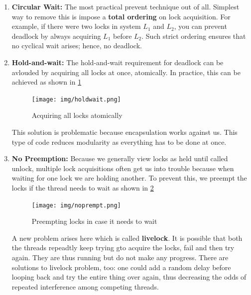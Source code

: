 \begin{enumerate}
    \item \textbf{Circular Wait:} The most practical prevent technique out of
        all. Simplest way to remove this is impose a \textbf{total ordering} on
        lock acquisition. For example, if there were two locks in system
        $L_1$ and $L_2$, you can prevent deadlock by always acquiring $L_1$
        before $L_2$. Such strict ordering ensures that no cyclical wait
        arises; hence, no deadlock.

    \item \textbf{Hold-and-wait:} The hold-and-wait requirement for deadlock
        can be avlouded by acquiring all locks at once, atomically. In practice,
        this can be achieved as shown in \ref{holdwait}

        \begin{figure}[h!]
            \label{holdwait}
            \begin{center}
                \texttt{[image: img/holdwait.png]}
                \caption{Acquiring all locks atomically}
            \end{center}
        \end{figure}

        This solution is problematic because encapsulation works against us.
        This type of code reduces modularity as everything has to be done at 
        once.

    \item \textbf{No Preemption:} Because we generally view locks as held
        until called unlock, multiple lock acquisitions often get us into 
        trouble because when waiting for one lock we are holding another. To
        prevent this, we preempt the locks if the thread needs to wait as shown
        in \ref{noprempt}

        \begin{figure}[h!]
            \label{noprempt}
            \begin{center}
                \texttt{[image: img/noprempt.png]}
                \caption{Preempting locks in case it needs to wait}
            \end{center}
        \end{figure}

        A new problem arises here which is called \textbf{livelock}. It is
        possible that both the threads repeadtly keep trying gto acquire the
        locks, fail and then try again. They are thus running but do not make
        any progress. There are solutions to livelock problem, too: one could
        add a random delay before looping back and try the entire thing over
        again, thus decreasing the odds of repeated interference among 
        competing threads.\\


\end{enumerate}
